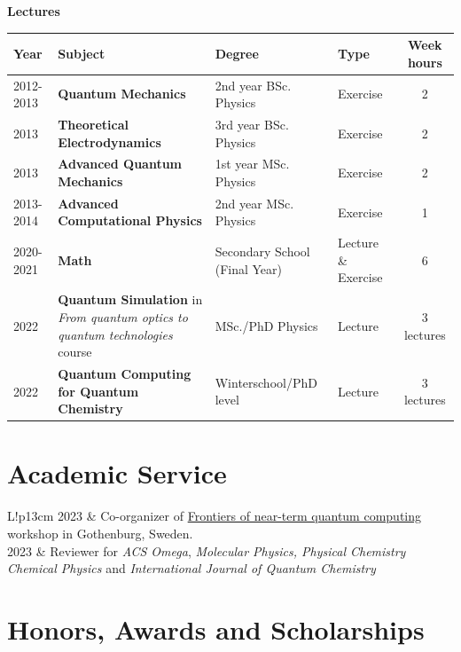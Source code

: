 \documentclass[11pt]{article}
\newcommand\VRule{\color{lightgray}\vrule width 0.5pt}
\begin{document}
	\begin{center}
		\bf	\Large Lectures
	\end{center}
	\vspace*{-0.5cm}
	\begin{center}
		\renewcommand{\arraystretch}{1.1}
		\begin{tabular}{p{}p{}p{}p{}c}
			\hline
			\rowcolor{black!20}
			Year & Subject & Degree &  Type & Week hours \\
			\hline
			2012-2013 & \textbf{Quantum Mechanics}  & 2nd year BSc. Physics  & Exercise & 2 \\
			2013 & \textbf{Theoretical Electrodynamics}  & 3rd year BSc. Physics  & Exercise & 2  \\
			2013 & \textbf{Advanced Quantum Mechanics}  & 1st year MSc. Physics & Exercise & 2  \\
			2013-2014 & \textbf{Advanced Computational Physics}  & 2nd year MSc. Physics & Exercise & 1 \\
			2020-2021 & \textbf{Math} & Secondary School (Final Year) & Lecture \& Exercise & 6  \\
			2022 & \textbf{Quantum Simulation} in \emph{From quantum optics to quantum technologies} course & MSc./PhD Physics & Lecture & 3 lectures \\
			2022 & \textbf{Quantum Computing for Quantum Chemistry} & Winterschool/PhD level & Lecture & 3 lectures \\
			\bottomrule
		\end{tabular}	
	\end{center}
	
	\newpage
	
	\section*{Academic Service}
	
		\begin{tabular}{L!{\VRule}p{13cm}}
			2023 & Co-organizer of \href{https://www.chalmers.se/en/conference/frontiers-of-near-term-quantum-computing/}{Frontiers of near-term quantum computing} workshop in Gothenburg, Sweden. \\
			2023 & Reviewer for \emph{ACS Omega}, \emph{Molecular Physics, Physical Chemistry Chemical Physics} and \emph{International Journal of Quantum Chemistry}
		\end{tabular}
	
	\section*{Honors, Awards and Scholarships}
	
\end{document}
